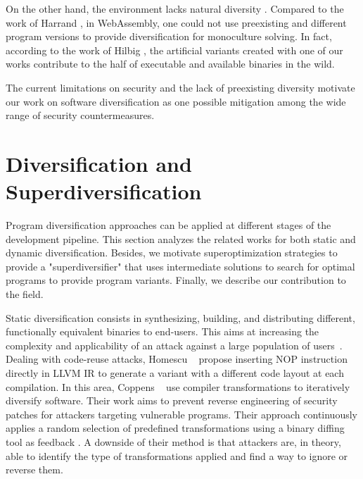 On the other hand, the \wasm environment lacks natural diversity \cite{natural_diversity}. Compared to the work of Harrand \etal \citationneeded, in WebAssembly, one could not use preexisting and different program versions to provide diversification for monoculture solving. In fact, according to the work of Hilbig \etal \cite{Hilbig2021AnES}, the artificial variants created with one of our works contribute to the half of executable and available \wasm binaries in the wild. 


The current limitations on security and the lack of preexisting diversity motivate our work on software diversification as one possible mitigation among the wide range of security countermeasures. 

\section{Diversification and Superdiversification}
\label{sota:diversification}


Program diversification approaches can be applied at different stages of the development pipeline. This section analyzes the related works for both static and dynamic diversification. Besides, we motivate superoptimization strategies to provide a "superdiversifier" that uses intermediate solutions to search for optimal programs to provide program variants. Finally, we describe our contribution to the field.

Static diversification consists in synthesizing, building, and distributing different, functionally equivalent binaries to end-users. This aims at increasing the complexity and applicability of an attack against a large population of users~\cite{cohen1993operating}. 
Dealing with code-reuse attacks, Homescu \etal~\cite{homescu2013profile} propose inserting NOP instruction directly in LLVM IR to generate a variant with a different code layout at each compilation. 
In this area, Coppens \etal~\cite{coppens2013feedback} use compiler transformations to iteratively diversify software.
Their work aims to prevent reverse engineering of security patches for attackers targeting vulnerable programs.
Their approach continuously applies a random selection of predefined transformations using a binary diffing tool as feedback \citationneeded.
A downside of their method is that attackers are, in theory, able to identify the type of transformations applied and find a way to ignore or reverse them.


